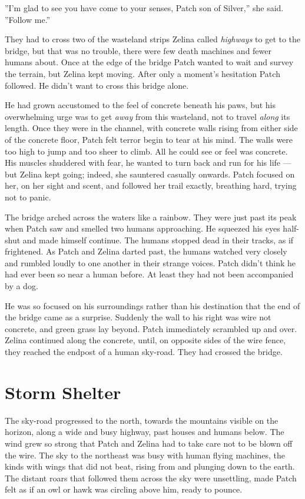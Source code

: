 \documentclass[12pt]{book}
\begin{document}
''I'm glad to see you have come to your senses, Patch son of Silver,'' she said. ''Follow me.''

They had to cross two of the wasteland strips Zelina called {\it highways} to get to the bridge, but that was no trouble, there were few death machines and fewer humans about. Once at the edge of the bridge Patch wanted to wait and survey the terrain, but Zelina kept moving. After only a moment's hesitation Patch followed. He didn't want to cross this bridge alone.

He had grown accustomed to the feel of concrete beneath his paws, but his overwhelming urge was to get {\it away} from this wasteland, not to travel {\it along} its length. Once they were in the channel, with concrete walls rising from either side of the concrete floor, Patch felt terror begin to tear at his mind. The walls were too high to jump and too sheer to climb. All he could see or feel was concrete. His muscles shuddered with fear, he wanted to turn back and run for his life ---
but Zelina kept going; indeed, she sauntered casually onwards. Patch focused on her, on her sight and scent, and followed her trail exactly, breathing hard, trying not to panic.

The bridge arched across the waters like a rainbow. They were just past its peak when Patch saw and smelled two humans approaching. He squeezed his eyes half-shut and made himself continue. The humans stopped dead in their tracks, as if frightened. As Patch and Zelina darted past, the humans watched very closely and rumbled loudly to one another in their strange voices. Patch didn't think he had ever been so near a human before. At least they had not been accompanied by a dog.

He was so focused on his surroundings rather than his destination that the end of the bridge came as a surprise. Suddenly the wall to his right was wire not concrete, and green grass lay beyond. Patch immediately scrambled up and over. Zelina continued along the concrete, until, on opposite sides of the wire fence, they reached the endpost of a human sky-road. They had crossed the bridge.


\section{Storm Shelter}

The sky-road progressed to the north, towards the mountains visible on the horizon, along a wide and busy highway, past houses and humans below. The wind grew so strong that Patch and Zelina had to take care not to be blown off the wire. The sky to the northeast was busy with human flying machines, the kinds with wings that did not beat, rising from and plunging down to the earth. The distant roars that followed them across the sky were unsettling, made Patch felt as if an owl or hawk was circling above him, ready to pounce.
\end{document}
